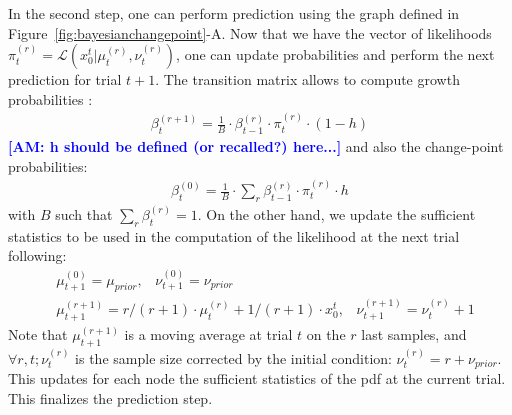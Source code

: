 \documentclass[12pt,english]{article}%
\newcommand{\eqa}[1]{\begin{align}#1\end{align}}
\newcommand{\Ll}{\mathcal{L}}
\newcommand{\seeFig}[1]{Figure~\ref{fig:#1}}
\newcommand{\seeEq}[1]{Equation~\ref{eq:#1}}
\newcommand{\AM}[1]{\textbf{\textcolor{blue}{[AM: #1]}}}
\begin{document}
In the second step, one can perform prediction 
using the graph defined in \seeFig{bayesianchangepoint}-A.
Now that we have the vector of likelihoods $\pi^{(r)}_t=\Ll(x_0^t |  \mu^{(r)}_{t}, \nu^{(r)}_{t})$, 
one can update probabilities and perform the next prediction for trial $t+1$.
The transition matrix %
allows to compute growth probabilities : %
\eqa{
\beta^{(r+1)}_t = \frac{1}{B} \cdot \beta^{(r)}_{t-1} \cdot \pi^{(r)}_{t} \cdot (1-h)
}
\AM{h should be defined (or recalled?) here...}
and also the change-point probabilities:
\eqa{
\beta^{(0)}_t  = \frac{1}{B} \cdot \sum_{r} \beta^{(r)}_{t-1} \cdot \pi^{(r)}_{t} \cdot h
}
with $B$ such that $\sum_{r} \beta^{(r)}_{t} = 1$.
On the other hand, we update the sufficient statistics to be used in the computation of the likelihood at the next trial following:
\eqa{
& \mu^{(0)}_{t+1} = \mu_{prior} \text{,} \quad \nu^{(0)}_{t+1} = \nu_{prior} \\
& \mu^{(r+1)}_{t+1} = r/(r+1) \cdot \mu^{(r)}_{t} + 1/(r+1) \cdot x_0^t \text{,} \quad \nu^{(r+1)}_{t+1} = \nu^{(r)}_{t} + 1
}
Note that $\mu^{(r+1)}_{t+1}$ is a moving average at trial $t$ on the $r$ last samples, 
and $\forall r, t; \nu^{(r)}_{t}$ is the sample size corrected by the initial condition: 
$\nu^{(r)}_{t} = r + \nu_{prior}$.
This updates for each node the sufficient statistics of the pdf at the current trial.
This finalizes the prediction step.
\end{document}
